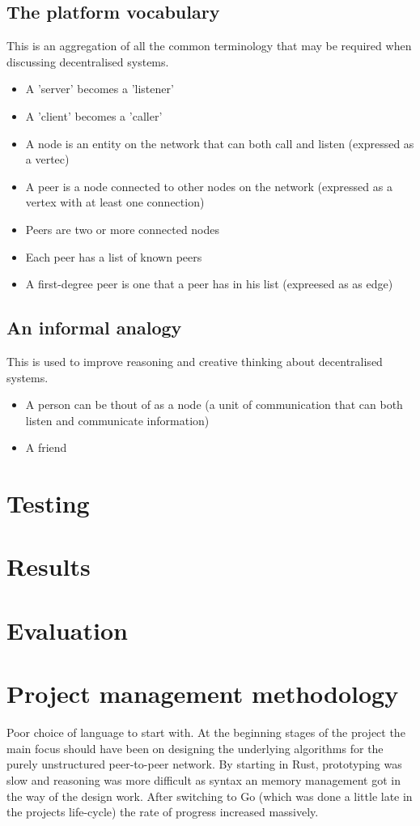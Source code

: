 \documentclass[a4paper]{article}
\begin{document}
\subsection{The platform vocabulary}
This is an aggregation of all the common terminology that may be required when discussing decentralised systems.
\begin{itemize}
    \item A 'server' becomes a 'listener'
    \item A 'client' becomes a 'caller'
    \item A node is an entity on the network that can both call and listen (expressed as a vertec)
    \item A peer is a node connected to other nodes on the network (expressed as a vertex with at least one connection)
    \item Peers are two or more connected nodes
    \item Each peer has a list of known peers
    \item A first-degree peer is one that a peer has in his list (expreesed as as edge)
\end{itemize}

\subsection{An informal analogy}
This is used to improve reasoning and creative thinking about decentralised systems.
\begin{itemize}
    \item A person can be thout of as a node (a unit of communication that can both listen and communicate information)
    \item A friend
\end{itemize}

\section{Testing}
\section{Results}
\section{Evaluation}
\section{Project management methodology} %
Poor choice of language to start with. At the beginning stages of the project the main focus should have been on designing the underlying algorithms for the purely unstructured peer-to-peer network. By starting in Rust, prototyping was slow and reasoning was more difficult as syntax an memory management got in the way of the design work. After switching to Go (which was done a little late in the projects life-cycle) the rate of progress increased massively.
\end{document}
